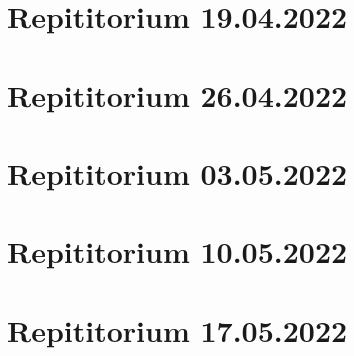 \documentclass[a4paper,12pt]{article}
\begin{document}
\tableofcontents
\newpage
\section{Repititorium 19.04.2022}

\newpage
\section{Repititorium 26.04.2022}

\newpage
\section{Repititorium 03.05.2022}

\newpage
\section{Repititorium 10.05.2022}

\newpage
\section{Repititorium 17.05.2022}

\end{document}
